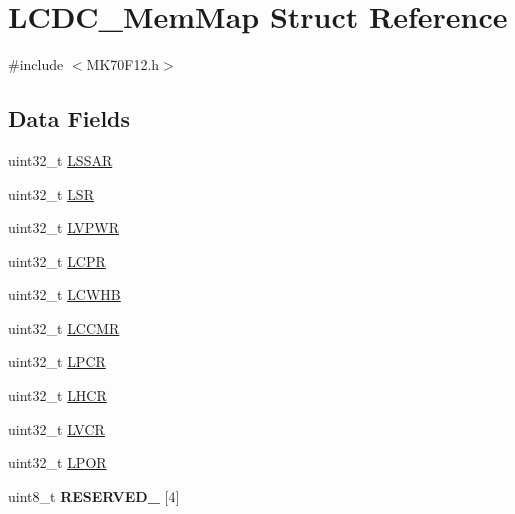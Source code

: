 \hypertarget{struct_l_c_d_c___mem_map}{}\section{L\+C\+D\+C\+\_\+\+Mem\+Map Struct Reference}
\label{struct_l_c_d_c___mem_map}


{\ttfamily \#include $<$M\+K70\+F12.\+h$>$}

\subsection*{Data Fields}
\begin{DoxyCompactItemize}
\item 
uint32\+\_\+t \hyperlink{struct_l_c_d_c___mem_map_a56099c0d6e2b6c8d677a9f2bdd84706f}{L\+S\+S\+A\+R}
\item 
uint32\+\_\+t \hyperlink{struct_l_c_d_c___mem_map_a6edf826456a2431e94e3bcafcfe89867}{L\+S\+R}
\item 
uint32\+\_\+t \hyperlink{struct_l_c_d_c___mem_map_aa687c8b47cdcef18890cac689de49a17}{L\+V\+P\+W\+R}
\item 
uint32\+\_\+t \hyperlink{struct_l_c_d_c___mem_map_a54db054fbd1e4a7de44253909bbc8944}{L\+C\+P\+R}
\item 
uint32\+\_\+t \hyperlink{struct_l_c_d_c___mem_map_a5766a743e828957c73257ebd66133a92}{L\+C\+W\+H\+B}
\item 
uint32\+\_\+t \hyperlink{struct_l_c_d_c___mem_map_a35f3831166bce45afb02d6cfa594fd84}{L\+C\+C\+M\+R}
\item 
uint32\+\_\+t \hyperlink{struct_l_c_d_c___mem_map_a0f61ba79429b1dbdfe3a3a98830393d9}{L\+P\+C\+R}
\item 
uint32\+\_\+t \hyperlink{struct_l_c_d_c___mem_map_a7fbf22cdf2affd3ab924be930a2e2ef6}{L\+H\+C\+R}
\item 
uint32\+\_\+t \hyperlink{struct_l_c_d_c___mem_map_a865c74a990435ca94ba226f23894d8e7}{L\+V\+C\+R}
\item 
uint32\+\_\+t \hyperlink{struct_l_c_d_c___mem_map_ad2600d7c7ec0833a8b9089da675254b6}{L\+P\+O\+R}
\item 
\hypertarget{struct_l_c_d_c___mem_map_a30237876bbe9ad003054ee77df7434f6}{}uint8\+\_\+t {\bfseries R\+E\+S\+E\+R\+V\+E\+D\+\_} \mbox{[}4\mbox{]}\label{struct_l_c_d_c___mem_map_a30237876bbe9ad003054ee77df7434f6}


\end{DoxyCompactItemize}
